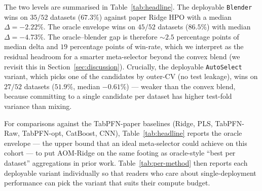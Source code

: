 \documentclass[11pt,a4paper]{article}
\newcommand{\AOMR}{\textsc{AOM-Ridge}\xspace}
\begin{document}
The two levels are summarised in Table~\ref{tab:headline}. The
deployable \texttt{Blender} wins on $35/52$ datasets ($67.3\%$)
against paper Ridge HPO with a median $\Delta = -2.22\%$. The
oracle envelope wins on $45/52$ datasets ($86.5\%$) with median
$\Delta = -4.73\%$. The oracle--blender gap is therefore
$\sim 2.5$ percentage points of median delta and $19$ percentage
points of win-rate, which we interpret as the residual headroom for
a smarter meta-selector beyond the convex blend (we revisit this in
Section~\ref{sec:discussion}). Crucially, the deployable
\texttt{AutoSelect} variant, which picks one of the candidates by
outer-CV (no test leakage), wins on $27/52$ datasets ($51.9\%$,
median $-0.61\%$) --- weaker than the convex blend, because
committing to a single candidate per dataset has higher test-fold
variance than mixing.

For comparisons against the TabPFN-paper baselines (Ridge, PLS,
TabPFN-Raw, TabPFN-opt, CatBoost, CNN), Table~\ref{tab:headline}
reports the oracle envelope --- the upper bound that an ideal
meta-selector could achieve on this cohort --- to put AOM-Ridge on
the same footing as oracle-style ``best per dataset'' aggregations
in prior work. Table~\ref{tab:per-method} then reports each
deployable variant individually so that readers who care about
single-deployment performance can pick the variant that suits their
compute budget.

\begin{table}[t]
\centering
\caption{Headline regression: \AOMR\ vs.\ all baselines on the
54-dataset NIRS regression cohort (the cohort assembled from the
TabPFN paper benchmark, with \texttt{Quartz\_spxy70} excluded for a
degenerate paper-Ridge reference of $3.4\!\times\!10^{-9}$ and
\texttt{LUCAS\_SOC\_Cropland\_8731\_NocitaKS} excluded from the wrappers
benchmark for a 30+\,h-per-fit budget; medians are computed on the
$N=52$ paired datasets, except \emph{vs.\ CNN} which uses $N=47$ paired
datasets (CNN is missing on five). Generated from
\texttt{benchmark\_runs/all54\_combined/results.csv}.}
\label{tab:headline}

\end{table}

\begin{table}[t]
\centering
\caption{Per-variant ranking on the 52-dataset cohort, sorted by mean
rank (lower is better; lower median delta vs.\ paper Ridge HPO is
better). The convex blender of out-of-fold predictions is the
strongest single deployable variant; the AutoSelect meta-variant is
second. The split-aware inner CV is the strongest single
fast variant. Variants with $N<52$ were excluded from the broad
all-cohort run for compute reasons (the ten-branch
\texttt{branch\_global} and the EMSC-2 / OSC branches scale
quadratically in $n$). Generated from
\texttt{benchmark\_runs/all54\_combined/results.csv}.}
\label{tab:per-method}

\end{table}
\end{document}

